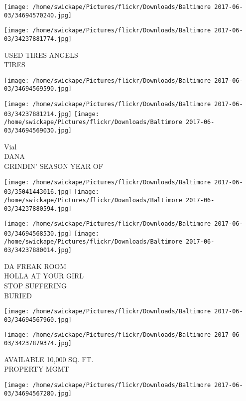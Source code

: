 \documentclass[10pt,letterpaper]{article}
\begin{document}
\texttt{[image: /home/swickape/Pictures/flickr/Downloads/Baltimore 2017-06-03/34694570240.jpg]}

\vspace{0.25in}
\texttt{[image: /home/swickape/Pictures/flickr/Downloads/Baltimore 2017-06-03/34237881774.jpg]}

USED TIRES ANGELS\\
TIRES\\
\pagebreak

\texttt{[image: /home/swickape/Pictures/flickr/Downloads/Baltimore 2017-06-03/34694569590.jpg]}

\vspace{0.25in}
\texttt{[image: /home/swickape/Pictures/flickr/Downloads/Baltimore 2017-06-03/34237881214.jpg]}
\texttt{[image: /home/swickape/Pictures/flickr/Downloads/Baltimore 2017-06-03/34694569030.jpg]}

Vial\\
DANA\\
GRINDIN' SEASON YEAR OF\\
\pagebreak

\texttt{[image: /home/swickape/Pictures/flickr/Downloads/Baltimore 2017-06-03/35041443016.jpg]}
\texttt{[image: /home/swickape/Pictures/flickr/Downloads/Baltimore 2017-06-03/34237880594.jpg]}

\texttt{[image: /home/swickape/Pictures/flickr/Downloads/Baltimore 2017-06-03/34694568530.jpg]}
\texttt{[image: /home/swickape/Pictures/flickr/Downloads/Baltimore 2017-06-03/34237880014.jpg]}

DA FREAK ROOM\\
HOLLA AT YOUR GIRL\\
STOP SUFFERING\\
BURIED\\
\pagebreak

\texttt{[image: /home/swickape/Pictures/flickr/Downloads/Baltimore 2017-06-03/34694567960.jpg]}

\vspace{0.25in}
\texttt{[image: /home/swickape/Pictures/flickr/Downloads/Baltimore 2017-06-03/34237879374.jpg]}

AVAILABLE 10,000 SQ. FT.\\
PROPERTY MGMT\\
\pagebreak

\texttt{[image: /home/swickape/Pictures/flickr/Downloads/Baltimore 2017-06-03/34694567280.jpg]}
\end{document}
